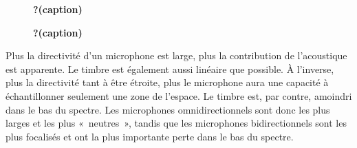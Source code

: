 \documentclass[
  letterpaper,
  DIV=11,
  numbers=noendperiod]{scrreprt}
\begin{document}
\begin{figure}

\begin{minipage}[t]{0.50\linewidth}

{\centering 


\caption{\label{fig-dir}\textbf{?(caption)}}

}

\end{minipage}%
%
\begin{minipage}[t]{0.50\linewidth}

{\centering 


\caption{\label{fig-dir2}\textbf{?(caption)}}

}

\end{minipage}%

\end{figure}

Plus la directivité d'un microphone est large, plus la contribution de
l'acoustique est apparente. Le timbre est également aussi linéaire que
possible. À l'inverse, plus la directivité tant à être étroite, plus le
microphone aura une capacité à échantillonner seulement une zone de
l'espace. Le timbre est, par contre, amoindri dans le bas du spectre.
Les microphones omnidirectionnels sont donc les plus larges et les plus
«~neutres~», tandis que les microphones bidirectionnels sont les plus
focalisés et ont la plus importante perte dans le bas du spectre.
\end{document}
